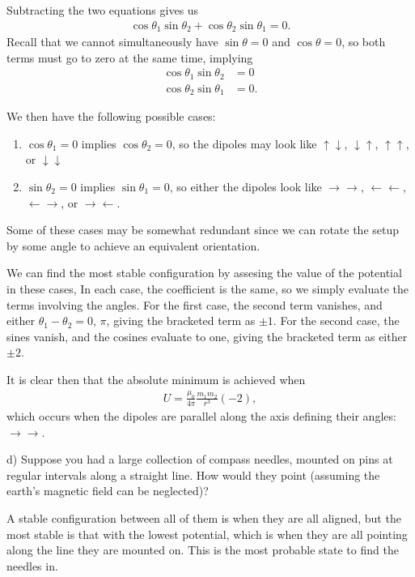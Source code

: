 \documentclass[12pt,a4paper]{article}
\begin{document}
Subtracting the two equations gives us
\begin{align*}
    \cos{\theta_1} \sin{\theta_2} + \cos{\theta_2} \sin{\theta_1} = 0
.\end{align*}
Recall that we cannot simultaneously have $\sin{\theta} = 0$ and $\cos{\theta} = 0$, so both terms must go to zero at the same time, implying 
\begin{align*}
    \cos{\theta_1} \sin{\theta_2} &= 0 \\
    \cos{\theta_2} \sin{\theta_1} &= 0
.\end{align*}

We then have the following possible cases:
\begin{enumerate}
    \item $\cos{\theta_1} = 0$ implies $\cos{\theta_2} = 0$, so the dipoles may look like $\uparrow \downarrow$, $\downarrow \uparrow$, $\uparrow \uparrow$, or $\downarrow \downarrow$
    \item $\sin{\theta_2} = 0$ implies $\sin{\theta_1} = 0$, so either the dipoles look like $\rightarrow \rightarrow$, $\leftarrow \leftarrow$, $\leftarrow \rightarrow$, or $\rightarrow \leftarrow$.
\end{enumerate}

Some of these cases may be somewhat redundant since we can rotate the setup by some angle to achieve an equivalent orientation.

We can find the most stable configuration by assesing the value of the potential in these cases,
In each case, the coefficient is the same, so we simply evaluate the terms involving the angles.
For the first case, the second term vanishes, and either $\theta_1 - \theta_2 = 0,\,\pi$, giving the bracketed term as $\pm 1$.
For the second case, the sines vanish, and the cosines evaluate to one, giving the bracketed term as either $\pm 2$.

It is clear then that the absolute minimum is achieved when
\begin{align*}
    U = \frac{\mu_0}{4 \pi}\frac{m_1m_2}{r^3}\left( -2 \right)
,\end{align*}
which occurs when the dipoles are parallel along the axis defining their angles: $\rightarrow \rightarrow$.

d) Suppose you had a large collection of compass needles, mounted on pins at regular intervals along a straight line.
How would they point (assuming the earth's magnetic field can be neglected)?

A stable configuration between all of them is when they are all aligned, but the most stable is that with the lowest potential, which is when they are all pointing along the line they are mounted on.
This is the most probable state to find the needles in.
\end{document}
